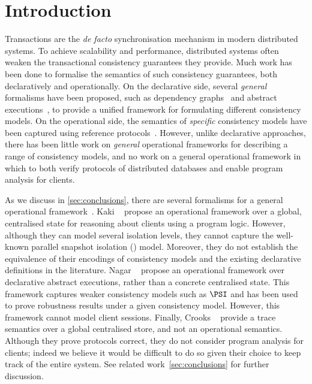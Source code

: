\section{Introduction}
Transactions are the \emph{de facto} synchronisation mechanism in modern distributed systems.
To achieve scalability and performance, distributed systems often weaken the transactional consistency guarantees they provide. 
%
%
Much work has been done to formalise the semantics of such consistency guarantees, both
declaratively and operationally.
On the declarative side, several \emph{general} formalisms have been proposed, 
such as dependency graphs~\cite{adya} and abstract executions~\cite{framework-concur}, to provide a unified
framework for formulating different consistency models.  
On the operational side, the semantics of \emph{specific} consistency models have
been captured using reference protocols~\cite{si,PSI,PSI-RA}. 
However, unlike declarative approaches, there has been
little work on \emph{general} operational frameworks for describing a range
of consistency models, and no work on a general operational framework
in which to both verify protocols of distributed databases and 
enable program analysis for clients.

As we discuss in \cref{sec:conclusions}, there are several formalisms for a general operational framework~\cite{sureshConcur,alonetogether,seebelieve}. 
Kaki \etal~\cite{alonetogether} propose an operational framework over a global, centralised state for reasoning about clients using a program logic. 
However, although they can model several isolation levels, they cannot capture the well-known
parallel snapshot isolation (\PSI) model. 
Moreover, they do not establish the equivalence of their encodings of consistency models 
and the existing declarative definitions in the literature. 
Nagar \etal~\cite{sureshConcur} propose an operational framework over declarative abstract executions, rather than a concrete centralised state. This framework captures weaker consistency models
such as \(\PSI\) and has been used to prove robustness results under a given consistency model.  
However, this framework cannot model client sessions.
Finally, Crooks \etal~\cite{seebelieve} provide a trace semantics over a global
centralised store, and not an operational semantics. 
Although they prove protocols correct, they do not consider program analysis for clients;
indeed we believe it would be difficult to do so given their choice to
keep track of the entire system.
See related work~\cref{sec:conclusions} for further discussion. 




